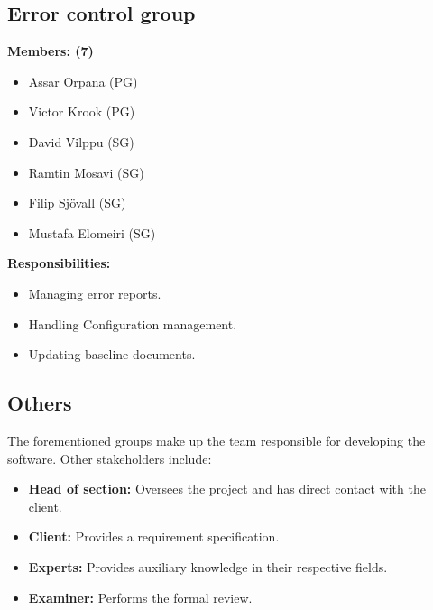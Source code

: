 \documentclass{article}
\begin{document}
    \subsection{Error control group}
        \textbf{Members: (7)}
        \begin{itemize}
            \item Assar Orpana (PG)
            \item Victor Krook (PG)
            \item David Vilppu (SG)
            \item Ramtin Mosavi (SG)
            \item Filip Sjövall (SG)
            \item Mustafa Elomeiri (SG)
        \end{itemize}
        \textbf{Responsibilities: }
        \begin{itemize}
            \item Managing error reports.
            \item Handling Configuration management.
            \item Updating baseline documents.  
        \end{itemize}

    \subsection{Others}
        The forementioned groups make up the team responsible for developing the software. Other stakeholders include:
        \begin{itemize}
            \item \textbf{Head of section:} Oversees the project and has direct contact with the client. 
            \item \textbf{Client:} Provides a requirement specification.
            \item \textbf{Experts:} Provides auxiliary knowledge in their respective fields.
            \item \textbf{Examiner:} Performs the formal review.
        \end{itemize}
\end{document}
